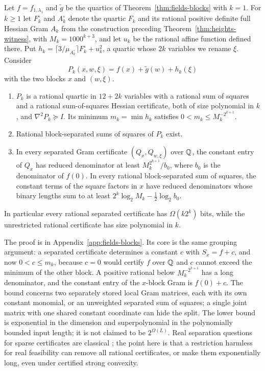 \begin{theorem}
\label{thm:fields-blocks-height}
Let $f=f_{1,\lambda_1}$ and $\tilde g$ be the quartics of
Theorem~\ref{thm:fields-blocks} with $k=1$. For $k\ge1$ let $F_k^\circ$ and
$A_k^\circ$ denote the quartic $F_k$ and its rational positive definite full
Hessian Gram $A_k$ from the construction preceding
Theorem~\ref{thm:heights-witness}, with $M_k=1000^{k+3}$, and let $u_k$ be
the rational affine function defined there. Put
$h_k=\lceil3/\mu_{A_k^\circ}\rceil F_k^\circ+u_k^2$, a quartic whose $2k$
variables we rename $\xi$. Consider
\[
 P_k(x,w,\xi)=f(x)+\tilde g(w)+h_k(\xi)
\]
with the two blocks $x$ and $(w,\xi)$.
\begin{enumerate}[label=(\alph*)]
\item $P_k$ is a rational quartic in $12+2k$ variables with a rational sum of
  squares and a rational sum-of-squares Hessian certificate, both of size
  polynomial in $k$, and $\nabla^2P_k\succeq I$. Its minimum
  $m_k=\min h_k$ satisfies $0<m_k\le M_k^{-2^{k+1}}$.
\item Rational block-separated sums of squares of $P_k$ exist.
\item In every separated Gram certificate $(Q_x,Q_{w,\xi})$ over $\mathbb Q$, the
  constant entry of $Q_x$ has reduced denominator at least
  $M_k^{2^{k+1}}/b_0$, where $b_0$ is the denominator of $f(0)$. In every
  rational block-separated sum of squares, the constant terms of the square
  factors in $x$ have reduced denominators whose binary lengths sum to at
  least $2^k\log_2M_k-\frac12\log_2b_0$.
\end{enumerate}
In particular every rational separated certificate has $\Omega(k2^k)$ bits,
while the unrestricted rational certificate has size polynomial in $k$.
\end{theorem}

The proof is in Appendix~\ref{app:fields-blocks}. Its core is the same
grouping argument: a separated certificate determines a constant $c$ with
$S_x=f+c$, and now $0<c\le m_k$, because $c=0$ would certify $f$ over $\mathbb Q$ and
$c$ cannot exceed the minimum of the other block. A positive rational below
$M_k^{-2^{k+1}}$ has a long denominator, and the constant entry of the
$x$-block Gram is $f(0)+c$. The bound concerns two separately stored local
Gram matrices, each with its own constant monomial, or an unweighted
separated sum of squares; a single joint matrix with one shared constant
coordinate can hide the split. The lower bound is exponential in the
dimension and superpolynomial in the polynomially bounded input length; it is
not claimed to be $2^{\Omega(L)}$. Real separation questions for sparse
certificates are classical \cite{KojimaKimWaki2005}; the point here is that
a restriction harmless for real feasibility can remove all rational
certificates, or make them exponentially long, even under certified strong
convexity.
